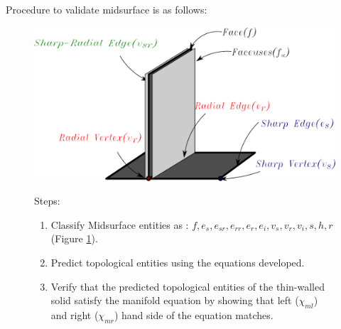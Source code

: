Procedure to validate midsurface is as follows:%

\begin{figure}[h]
\centering 
\begin{minipage}[h]{0.5\linewidth} 
\includegraphics[width=\linewidth]{../Common/images/NonManifoldT1.pdf}
\label{fig_nonmanifold}
\end{minipage}
\begin{minipage}[h]{0.45\linewidth} 
Steps:
\begin{enumerate}[noitemsep,topsep=2pt,parsep=2pt,partopsep=2pt]
\item Classify Midsurface entities  as : $f, e_s , e_{sr} , e_{rr}, e_r , e_i, v_s , v_r , v_i, s , h , r$ (Figure \ref{fig_nonmanifold}).
\item Predict topological entities using the equations developed. %
\item Verify that the predicted topological entities of the  thin-walled solid satisfy the manifold equation by showing that left ($\chi_{ml}$) and right  ($\chi_{mr}$) hand side of the equation matches. %
\end{enumerate}
\end{minipage}

\end{figure}





